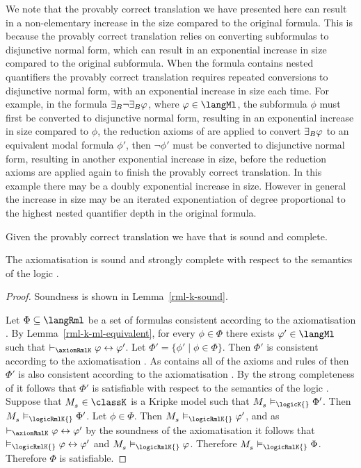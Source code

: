 We note that the provably correct translation we have presented here can result in a non-elementary increase in the size compared to the original formula.
This is because the provably correct translation relies on converting subformulas to disjunctive normal form, which can result in an exponential increase in size compared to the original subformula.
When the formula contains nested quantifiers the provably correct translation requires repeated conversions to disjunctive normal form, with an exponential increase in size each time.
For example, in the formula ${\exists_{B}} \lnot {\exists_{B}} \varphi$, where $\phi \in \langMl$, the subformula $\phi$ must first be converted to disjunctive normal form, resulting in an exponential increase in size compared to $\phi$, the reduction axioms of \axiomRmlK{} are applied to convert ${\exists_{B}} \varphi$ to an equivalent modal formula $\phi'$, then $\lnot \phi'$ must be converted to disjunctive normal form, resulting in another exponential increase in size, before the reduction axioms are applied again to finish the provably correct translation.
In this example there may be a doubly exponential increase in size.
However in general the increase in size may be an iterated exponentiation of degree proportional to the highest nested quantifier depth in the original formula.

\pagebreak

Given the provably correct translation we have that \axiomRmlK{} is sound and complete.

\begin{theorem}\label{rml-k-sound-complete}
The axiomatisation \axiomRmlK{} is sound and strongly complete with respect to the semantics of the logic \logicRmlK{}.
\end{theorem}

\begin{proof}
Soundness is shown in Lemma~\ref{rml-k-sound}.

Let $\Phi \subseteq \langRml$ be a set of formulas consistent according to the axiomatisation \axiomRmlK{}.
By Lemma~\ref{rml-k-ml-equivalent}, for every $\phi \in \Phi$ there exists $\phi' \in \langMl$ such that $\proves_\axiomRmlK \phi \iff \phi'$.
Let $\Phi' = \{\phi' \mid \phi \in \Phi\}$.
Then $\Phi'$ is consistent according to the axiomatisation \axiomRmlK{}.
As \axiomRmlK{} contains all of the axioms and rules of \axiomK{} then $\Phi'$ is also consistent according to the axiomatisation \axiomK{}.
By the strong completeness of \axiomK{} it follows that $\Phi'$ is satisfiable with respect to the semantics of the logic \logicK{}.
Suppose that $\kPModel{\kStateS} \in \classK$ is a Kripke model such that $\kPModel{\kStateS} \entails_\logicK{} \Phi'$.
Then $\kPModel{\kStateS} \entails_\logicRmlK{} \Phi'$.
Let $\phi \in \Phi$.
Then $\kPModel{\kStateS} \entails_\logicRmlK{} \phi'$, and as $\proves_\axiomRmlK \phi \iff \phi'$ by the soundness of the axiomatisation \axiomRmlK{} it follows that $\entails_\logicRmlK{} \phi \iff \phi'$ and $\kPModel{\kStateS} \entails_\logicRmlK{} \phi$.
Therefore $\kPModel{\kStateS} \entails_\logicRmlK{} \Phi$.
Therefore $\Phi$ is satisfiable.
\end{proof}

